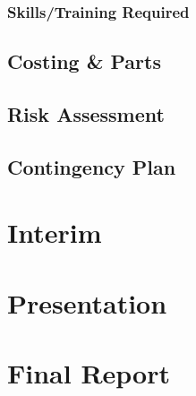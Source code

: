 \documentclass[12pt]{article}
\begin{document}
\subsubsection{Skills/Training Required}

\subsection{Costing \& Parts}

\subsection{Risk Assessment}

\subsection{Contingency Plan}

\section{Interim}

\section{Presentation}

\section{Final Report}
\end{document}
